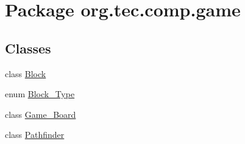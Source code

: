 \hypertarget{namespaceorg_1_1tec_1_1comp_1_1game}{}\section{Package org.\+tec.\+comp.\+game}
\label{namespaceorg_1_1tec_1_1comp_1_1game}
\subsection*{Classes}
\begin{DoxyCompactItemize}
\item 
class \mbox{\hyperlink{classorg_1_1tec_1_1comp_1_1game_1_1_block}{Block}}
\item 
enum \mbox{\hyperlink{enumorg_1_1tec_1_1comp_1_1game_1_1_block___type}{Block\+\_\+\+Type}}
\item 
class \mbox{\hyperlink{classorg_1_1tec_1_1comp_1_1game_1_1_game___board}{Game\+\_\+\+Board}}
\item 
class \mbox{\hyperlink{classorg_1_1tec_1_1comp_1_1game_1_1_pathfinder}{Pathfinder}}
\end{DoxyCompactItemize}
